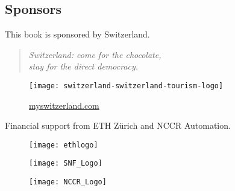 
\vfill
\subsection{Sponsors}

This book is sponsored by Switzerland.

\begin{quote}\centering
    \itshape
    Switzerland: come for the chocolate,\\
    stay for the direct democracy.
\end{quote}

\begin{figure}[h]
    \centering
    \texttt{[image: switzerland-switzerland-tourism-logo]}

    \href{http://myswitzerland.com}{myswitzerland.com}
\end{figure}


Financial support from ETH Zürich and NCCR Automation.
\begin{figure}[h]
    \centering
    \texttt{[image: ethlogo]}
\end{figure}

\begin{figure}[h]
    \centering
    \texttt{[image: SNF\_Logo]}
\end{figure}

\begin{figure}[h]
    \centering
    \texttt{[image: NCCR\_Logo]}
\end{figure}

\vfill